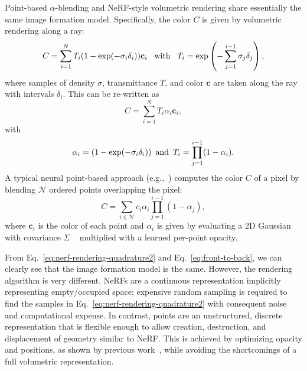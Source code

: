 Point-based $\alpha$-blending and NeRF-style volumetric rendering share essentially the same image formation model.
Specifically, the color $C$ is given by volumetric rendering along a ray:
\begin{equation}
	\label{eq:nerf-rendering-quadrature}
	C = \sum_{i=1}^N T_i(1-\exp(-\sigma_i\delta_i))\mathbf{c}_i \hspace{0.5em} \text{ with } \hspace{0.5em} T_i = \exp\left(-\sum_{j=1}^{i-1}\sigma_j\delta_j\right),
\end{equation}
where samples of density $\sigma$, transmittance $T$, and color $\mathbf{c}$ are taken along the ray with intervals $\delta_i$.
This can be re-written as
\begin{equation}
	\label{eq:nerf-rendering-quadrature2}
	C = \sum_{i=1}^N T_i\alpha_i\mathbf{c}_i,
\end{equation}
with
\begin{equation*}
	\alpha_i = (1-\exp(-\sigma_i\delta_i)) 
	\hspace{0.5em} \text{and} \hspace{0.5em}
	T_i = \prod_{j=1}^{i-1}(1-\alpha_i).
\end{equation*}
A typical neural point-based approach (e.g.,~\cite{kopanas21,kopanas22}) computes the color $C$ of a pixel by blending $\mathcal{N}$ ordered points overlapping the pixel:
\begin{equation}
	\label{eq:front-to-back}
	C = \sum_{i \in \mathcal{N}}
	c_{i}\alpha_{i}
	\prod_{j=1}^{i-1}(1-\alpha_{j}),
\end{equation}
where $\mathbf{c}_i$ is the color of each point and $\alpha_i$ is given by evaluating a 2D Gaussian with covariance $\Sigma$ ~\cite{yifan19} multiplied with a learned per-point opacity. 

From Eq.~\ref{eq:nerf-rendering-quadrature2} and Eq.~\ref{eq:front-to-back}, we can clearly see that the image formation model is the same. However, the rendering algorithm is very different. NeRFs are a continuous representation implicitly representing empty/occupied space; expensive random sampling is required to find the samples in Eq.~\ref{eq:nerf-rendering-quadrature2} with consequent noise and computational expense. In contrast, points are an unstructured, discrete representation that is flexible enough to allow creation, destruction, and displacement of geometry similar to NeRF. This is achieved by optimizing opacity and positions, as shown by previous work~\cite{kopanas21}, while avoiding the shortcomings of a full volumetric representation. 

